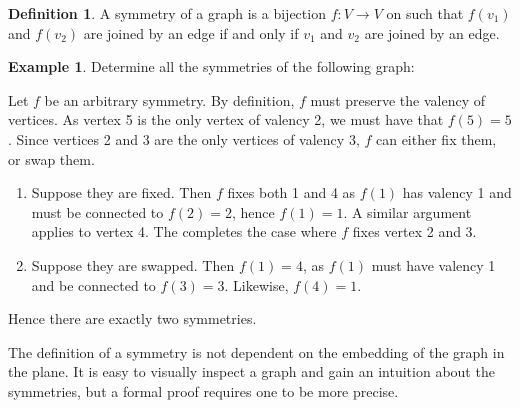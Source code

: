 \documentclass[12pt]{report}
\newenvironment{bluebox}{\begin{tcolorbox}[colback=blue!5!white,colframe=blue!75!black]}{\end{tcolorbox}}
\theoremstyle{definition}
\newtheorem{definition}[theorem]{Definition}
\newtheorem{example}[theorem]{Example}
\newenvironment{centre}{\begin{center}}{\end{center}}
\newenvironment{note}{\begin{bluebox}}{\end{bluebox}}
\begin{document}
\begin{definition}\cite[Definition 1.1.3]{wemyss2015grouptheory}
  A symmetry of a graph is a bijection \(f : V \to V\) on such that \(f(v_{1})\) and \(f(v_{2})\) are joined by an edge if and only if \(v_{1}\) and \(v_{2}\) are joined by an edge.
\end{definition}

\begin{example}
  Determine all the symmetries of the following graph:

  \begin{centre}
  \end{centre}

  Let \(f\) be an arbitrary symmetry.
  By definition, \(f\) must preserve the valency of vertices.
  As vertex 5 is the only vertex of valency 2, we must have that \(f(5) = 5\).
  Since vertices 2 and 3 are the only vertices of valency 3, \(f\) can either fix them, or swap them.
  \begin{enumerate}
  \item
    Suppose they are fixed.
    Then \(f\) fixes both 1 and 4 as \(f(1)\) has valency 1 and must be connected to \(f(2) = 2\), hence \(f(1) = 1\).
    A similar argument applies to vertex 4.
    The completes the case where \(f\) fixes vertex 2 and 3.
  \item
    Suppose they are swapped.
    Then \(f(1) = 4\), as \(f(1)\) must have valency 1 and be connected to \(f(3) = 3\).
    Likewise, \(f(4) = 1\).
  \end{enumerate}

  Hence there are exactly two symmetries.
\end{example}

\begin{note}
  The definition of a symmetry is not dependent on the embedding of the graph in the plane.
  It is easy to visually inspect a graph and gain an intuition about the symmetries, but a formal proof requires one to be more precise.
\end{note}
\end{document}
